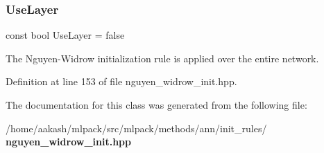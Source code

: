 \subsubsection{Use\+Layer}
{\footnotesize\ttfamily const bool Use\+Layer = false\hspace{0.3cm}{\ttfamily [static]}}



The Nguyen-\/\+Widrow initialization rule is applied over the entire network. 



Definition at line 153 of file nguyen\+\_\+widrow\+\_\+init.\+hpp.



The documentation for this class was generated from the following file\+:\begin{DoxyCompactItemize}
\item 
/home/aakash/mlpack/src/mlpack/methods/ann/init\+\_\+rules/\textbf{ nguyen\+\_\+widrow\+\_\+init.\+hpp}\end{DoxyCompactItemize}
